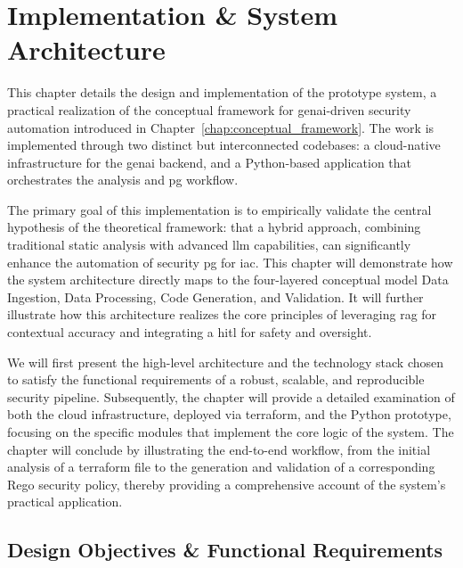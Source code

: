\chapter{Implementation \& System Architecture}
\label{chap:implementation}

This chapter details the design and implementation of the prototype system, a practical realization of the conceptual framework for \gls{genai}-driven security automation introduced in Chapter~\ref{chap:conceptual_framework}. The work is implemented through two distinct but interconnected codebases: a cloud-native infrastructure for the \gls{genai} backend, and a Python-based application that orchestrates the analysis and \gls{pg} workflow.

The primary goal of this implementation is to empirically validate the central hypothesis of the theoretical framework: that a hybrid approach, combining traditional static analysis with advanced \gls{llm} capabilities, can significantly enhance the automation of security \gls{pg} for \gls{iac}. This chapter will demonstrate how the system architecture directly maps to the four-layered conceptual model Data Ingestion, Data Processing, Code Generation, and Validation. It will further illustrate how this architecture realizes the core principles of leveraging \gls{rag} for contextual accuracy and integrating a \gls{hitl} for safety and oversight.

We will first present the high-level architecture and the technology stack chosen to satisfy the functional requirements of a robust, scalable, and reproducible security pipeline. Subsequently, the chapter will provide a detailed examination of both the cloud infrastructure, deployed via \gls{terraform}, and the Python prototype, focusing on the specific modules that implement the core logic of the system. The chapter will conclude by illustrating the end-to-end workflow, from the initial analysis of a \gls{terraform} file to the generation and validation of a corresponding Rego security policy, thereby providing a comprehensive account of the system's practical application.

\section{Design Objectives \& Functional Requirements}



